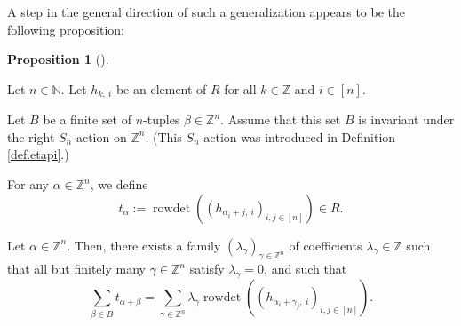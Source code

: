 \documentclass[numbers=enddot,12pt,final,onecolumn,notitlepage,english]{scrartcl}%
\theoremstyle{definition}
\newtheorem{prop}[theo]{Proposition}
\newenvironment{proposition}[1][]
{\begin{prop}[#1]\begin{leftbar}}
{\end{leftbar}\end{prop}}
\let\sumnonlimits\sum
\renewcommand{\sum}{\sumnonlimits\limits}
\begin{document}
A step in the general direction of such a generalization appears to be the
following proposition:

\begin{proposition}
\label{prop.pre-LR.symm}Let $n\in\mathbb{N}$. Let $h_{k,\ i}$ be an element of
$R$ for all $k\in\mathbb{Z}$ and $i\in\left[  n\right]  $.

Let $B$ be a finite set of $n$-tuples $\beta\in\mathbb{Z}^{n}$. Assume that
this set $B$ is invariant under the right $S_{n}$-action on $\mathbb{Z}^{n}$.
(This $S_{n}$-action was introduced in Definition \ref{def.etapi}.)

For any $\alpha\in\mathbb{Z}^{n}$, we define%
\[
t_{\alpha}:=\operatorname*{rowdet}\left(  \left(  h_{\alpha_{i}+j,\ i}\right)
_{i,j\in\left[  n\right]  }\right)  \in R.
\]


Let $\alpha\in\mathbb{Z}^{n}$. Then, there exists a family $\left(
\lambda_{\gamma}\right)  _{\gamma\in\mathbb{Z}^{n}}$ of coefficients
$\lambda_{\gamma}\in\mathbb{Z}$ such that all but finitely many $\gamma
\in\mathbb{Z}^{n}$ satisfy $\lambda_{\gamma}=0$, and such that%
\begin{equation}
\sum_{\beta\in B}t_{\alpha+\beta}=\sum_{\gamma\in\mathbb{Z}^{n}}%
\lambda_{\gamma}\operatorname*{rowdet}\left(  \left(  h_{\alpha_{i}+\gamma
_{j},\ i}\right)  _{i,j\in\left[  n\right]  }\right)  .
\label{eq.prop.pre-LR.symm.claim}%
\end{equation}

\end{proposition}
\end{document}
